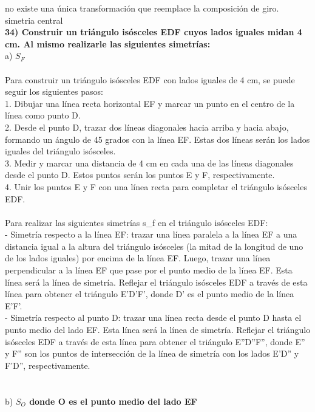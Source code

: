 \documentclass{article}
\begin{document}
no existe una única transformación que reemplace la composición de giro.\\
{\large simetria central}
\\
{\bf 34) Construir un triángulo isósceles EDF cuyos lados iguales midan 4 cm. Al mismo realizarle las siguientes simetrías: }\\
a) $S_F$\\
\\
Para construir un triángulo isósceles EDF con lados iguales de 4 cm, se puede seguir los siguientes pasos:\\
1. Dibujar una línea recta horizontal EF y marcar un punto en el centro de la línea como punto D.\\
2. Desde el punto D, trazar dos líneas diagonales hacia arriba y hacia abajo, formando un ángulo de 45 grados con la línea EF. Estas dos líneas serán los lados iguales del triángulo isósceles.\\
3. Medir y marcar una distancia de 4 cm en cada una de las líneas diagonales desde el punto D. Estos puntos serán los puntos E y F, respectivamente.\\
4. Unir los puntos E y F con una línea recta para completar el triángulo isósceles EDF.\\
\\
Para realizar las siguientes simetrías s\_f en el triángulo isósceles EDF:\\
- Simetría respecto a la línea EF: trazar una línea paralela a la línea EF a una distancia igual a la altura del triángulo isósceles (la mitad de la longitud de uno de los lados iguales) por encima de la línea EF. Luego, trazar una línea perpendicular a la línea EF que pase por el punto medio de la línea EF. Esta línea será la línea de simetría. Reflejar el triángulo isósceles EDF a través de esta línea para obtener el triángulo E'D'F', donde D' es el punto medio de la línea E'F'.\\
- Simetría respecto al punto D: trazar una línea recta desde el punto D hasta el punto medio del lado EF. Esta línea será la línea de simetría. Reflejar el triángulo isósceles EDF a través de esta línea para obtener el triángulo E''D''F'', donde E'' y F'' son los puntos de intersección de la línea de simetría con los lados E'D'' y F'D'', respectivamente.\\
\\ \\
b) {\bf $S_O$ donde O es el punto medio del lado EF }\\\\
\end{document}
